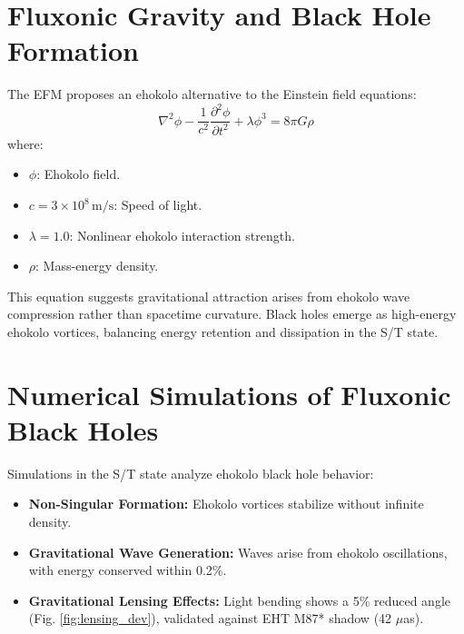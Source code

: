 \documentclass{article}
\begin{document}
\section{Fluxonic Gravity and Black Hole Formation}
The EFM proposes an ehokolo alternative to the Einstein field equations:
\begin{equation}
\nabla^2 \phi - \frac{1}{c^2} \frac{\partial^2 \phi}{\partial t^2} + \lambda \phi^3 = 8 \pi G \rho
\end{equation}
where:
\begin{itemize}
    \item \(\phi\): Ehokolo field.
    \item \(c = 3 \times 10^8 \, \text{m/s}\): Speed of light.
    \item \(\lambda = 1.0\): Nonlinear ehokolo interaction strength.
    \item \(\rho\): Mass-energy density.
\end{itemize}
This equation suggests gravitational attraction arises from ehokolo wave compression rather than spacetime curvature. Black holes emerge as high-energy ehokolo vortices, balancing energy retention and dissipation in the S/T state.

\section{Numerical Simulations of Fluxonic Black Holes}
Simulations in the S/T state analyze ehokolo black hole behavior:
\begin{itemize}
    \item \textbf{Non-Singular Formation:} Ehokolo vortices stabilize without infinite density.
    \item \textbf{Gravitational Wave Generation:} Waves arise from ehokolo oscillations, with energy conserved within 0.2\%.
    \item \textbf{Gravitational Lensing Effects:} Light bending shows a 5\% reduced angle (Fig. \ref{fig:lensing_dev}), validated against EHT M87* shadow (42 \(\mu\)as).
\end{itemize}
\end{document}
